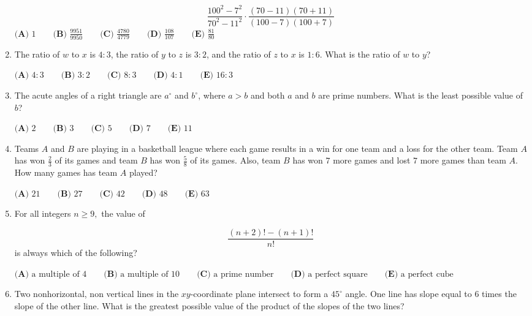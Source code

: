 \documentclass{article}
\begin{document}
\begin{enumerate}[label=\arabic*., itemsep=0.5em]
\begin{equation*}
\frac{100^2-7^2}{70^2-11^2} \cdot \frac{(70-11)(70+11)}{(100-7)(100+7)}
\end{equation*}
$\textbf{(A) } 1 \qquad \textbf{(B) } \frac{9951}{9950} \qquad \textbf{(C) } \frac{4780}{4779} \qquad \textbf{(D) } \frac{108}{107} \qquad \textbf{(E) } \frac{81}{80} $\par \vspace{0.5em}\item The ratio of $w$ to $x$ is $4 : 3$, the ratio of $y$ to $z$ is $3 : 2$, and the ratio of $z$ to $x$ is $1 : 6$. What is the ratio of $w$ to $y$?

$\textbf{(A) }4:3 \qquad \textbf{(B) }3:2 \qquad \textbf{(C) } 8:3 \qquad \textbf{(D) } 4:1 \qquad \textbf{(E) } 16:3 $\par \vspace{0.5em}\item The acute angles of a right triangle are $a^{\circ}$ and $b^{\circ}$, where $a>b$ and both $a$ and $b$ are prime numbers. What is the least possible value of $b$?

$\textbf{(A) }2\qquad\textbf{(B) }3\qquad\textbf{(C) }5\qquad\textbf{(D) }7\qquad\textbf{(E) }11$\par \vspace{0.5em}\item Teams $A$ and $B$ are playing in a basketball league where each game results in a win for one team and a loss for the other team. Team $A$ has won $\tfrac{2}{3}$ of its games and team $B$ has won $\tfrac{5}{8}$ of its games. Also, team $B$ has won $7$ more games and lost $7$ more games than team $A.$ How many games has team $A$ played?

$\textbf{(A) } 21 \qquad \textbf{(B) } 27 \qquad \textbf{(C) } 42 \qquad \textbf{(D) } 48 \qquad \textbf{(E) } 63$\par \vspace{0.5em}\item For all integers $n \geq 9,$ the value of

\begin{equation*}
\frac{(n+2)!-(n+1)!}{n!}
\end{equation*}
is always which of the following?

$\textbf{(A) } \text{a multiple of 4} \qquad \textbf{(B) } \text{a multiple of 10} \qquad \textbf{(C) } \text{a prime number} \qquad \textbf{(D) } \text{a perfect square} \qquad \textbf{(E) } \text{a perfect cube}$\par \vspace{0.5em}\item Two nonhorizontal, non vertical lines in the $xy$-coordinate plane intersect to form a $45^{\circ}$ angle. One line has slope equal to $6$ times the slope of the other line. What is the greatest possible value of the product of the slopes of the two lines?


\end{enumerate}
\end{document}
